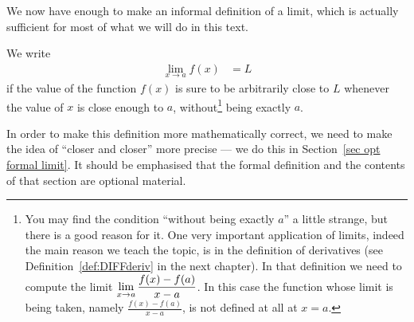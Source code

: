 We now have enough to make an informal definition of a limit, which is actually
sufficient for most of what we will do in this text.
\begin{defn}
  We write
\begin{align*}
  \lim_{x \to a} f(x) &= L
\end{align*}
 if the value of the function $f(x)$ is sure to be arbitrarily close to $L$ whenever the value of $x$ is close enough to $a$, without\footnote{You may find the condition ``without  being exactly $a$'' a little strange, but there is a good reason for it. One very  important application of limits, indeed the main reason we teach the topic, is in the definition of derivatives (see Definition~\ref{def:DIFFderiv} in the next chapter).  In that definition we need to compute the limit $\displaystyle \lim_{x\rightarrow a}\frac{f(x)-f(a)}{x-a}$. In this case the function whose limit is being taken, namely  $\frac{f(x)-f(a)}{x-a}$, is not defined at all at $x=a$.} being exactly $a$.
\end{defn}
In order to make this definition more mathematically correct, we need to
make the idea of ``closer and closer'' more precise --- we do this in
Section~\ref{sec opt formal limit}. It should be emphasised that the
formal definition and the contents of that section are optional
material.

